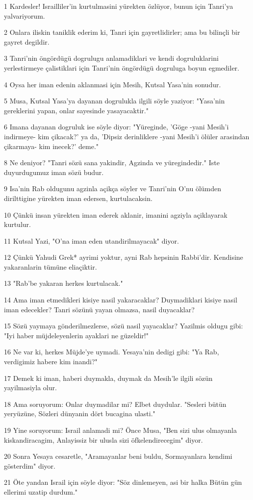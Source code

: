 \par 1 Kardesler! Israilliler'in kurtulmasini yürekten özlüyor, bunun için Tanri'ya yalvariyorum.
\par 2 Onlara iliskin taniklik ederim ki, Tanri için gayretlidirler; ama bu bilinçli bir gayret degildir.
\par 3 Tanri'nin öngördügü dogrulugu anlamadiklari ve kendi dogruluklarini yerlestirmeye çalistiklari için Tanri'nin öngördügü dogruluga boyun egmediler.
\par 4 Oysa her iman edenin aklanmasi için Mesih, Kutsal Yasa'nin sonudur.
\par 5 Musa, Kutsal Yasa'ya dayanan dogrulukla ilgili söyle yaziyor: "Yasa'nin gereklerini yapan, onlar sayesinde yasayacaktir."
\par 6 Imana dayanan dogruluk ise söyle diyor: "Yüreginde, 'Göge -yani Mesih'i indirmeye- kim çikacak?' ya da, 'Dipsiz derinliklere -yani Mesih'i ölüler arasindan çikarmaya- kim inecek?' deme."
\par 8 Ne deniyor? "Tanri sözü sana yakindir, Agzinda ve yüregindedir." Iste duyurdugumuz iman sözü budur.
\par 9 Isa'nin Rab oldugunu agzinla açikça söyler ve Tanri'nin O'nu ölümden dirilttigine yürekten iman edersen, kurtulacaksin.
\par 10 Çünkü insan yürekten iman ederek aklanir, imanini agziyla açiklayarak kurtulur.
\par 11 Kutsal Yazi, "O'na iman eden utandirilmayacak" diyor.
\par 12 Çünkü Yahudi Grek* ayrimi yoktur, ayni Rab hepsinin Rabbi'dir. Kendisine yakaranlarin tümüne eliaçiktir.
\par 13 "Rab'be yakaran herkes kurtulacak."
\par 14 Ama iman etmedikleri kisiye nasil yakaracaklar? Duymadiklari kisiye nasil iman edecekler? Tanri sözünü yayan olmazsa, nasil duyacaklar?
\par 15 Sözü yaymaya gönderilmezlerse, sözü nasil yayacaklar? Yazilmis oldugu gibi: "Iyi haber müjdeleyenlerin ayaklari ne güzeldir!"
\par 16 Ne var ki, herkes Müjde'ye uymadi. Yesaya'nin dedigi gibi: "Ya Rab, verdigimiz habere kim inandi?"
\par 17 Demek ki iman, haberi duymakla, duymak da Mesih'le ilgili sözün yayilmasiyla olur.
\par 18 Ama soruyorum: Onlar duymadilar mi? Elbet duydular. "Sesleri bütün yeryüzüne, Sözleri dünyanin dört bucagina ulasti."
\par 19 Yine soruyorum: Israil anlamadi mi? Önce Musa, "Ben sizi ulus olmayanla kiskandiracagim, Anlayissiz bir ulusla sizi öfkelendirecegim" diyor.
\par 20 Sonra Yesaya cesaretle, "Aramayanlar beni buldu, Sormayanlara kendimi gösterdim" diyor.
\par 21 Öte yandan Israil için söyle diyor: "Söz dinlemeyen, asi bir halka Bütün gün ellerimi uzatip durdum."

